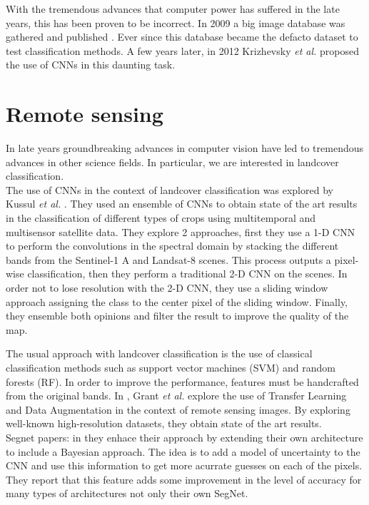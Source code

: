With the tremendous advances that computer power has suffered in the late years, this has been proven to be incorrect. In 2009 a big image database was gathered and published \cite{Deng09imagenet:a}. Ever since this database became the defacto dataset to test classification methods. A few years later, in 2012 Krizhevsky \textit{et al.} \cite{krizhevsky} proposed the use of CNNs in this daunting task.\\

\section{Remote sensing}

In late years groundbreaking advances in computer vision have led to tremendous advances in other science fields. In particular, we are interested in landcover classification.\\

The use of CNNs in the context of landcover classification was explored by Kussul \textit{et al.} \cite{7891032}. They used an ensemble of CNNs to obtain state of the art results in the classification of different types of crops using multitemporal and multisensor satellite data. They explore 2 approaches, first they use a 1-D CNN to perform the convolutions in the spectral domain by stacking the different bands from the Sentinel-1 A and Landsat-8 scenes. This process outputs a pixel-wise classification, then they perform a traditional 2-D CNN on the scenes. In order not to lose resolution with the 2-D CNN, they use a sliding window approach assigning the class to the center pixel of the sliding window. Finally, they ensemble both opinions and filter the result to improve the quality of the map.

The usual approach with landcover classification is the use of classical classification methods such as support vector machines (SVM) and random forests (RF). In order to improve the performance, features must be handcrafted from the original bands. In \cite{7858676}, Grant \textit{et al.} explore the use of Transfer Learning and Data Augmentation in the context of remote sensing images. By exploring well-known high-resolution datasets, they obtain state of the art results.\\


Segnet papers: \cite{DBLP:journals/corr/BadrinarayananK15} in \cite{DBLP:journals/corr/KendallBC15} they enhace their approach by extending their own architecture to include a Bayesian approach. The idea is to add a model of uncertainty to the CNN and use this information to get more acurrate guesses on each of the pixels. They report that this feature adds some improvement in the level of accuracy for many types of architectures not only their own SegNet.





